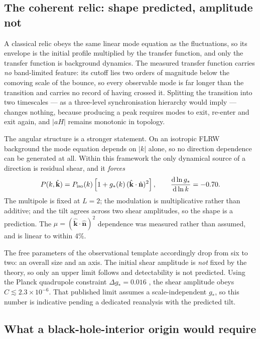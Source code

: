 \documentclass[a4paper,11pt]{article}
\begin{document}
\subsection{The coherent relic: shape predicted, amplitude not}

A classical relic obeys the same linear mode equation as the fluctuations, so its envelope is the initial profile multiplied by the transfer function, and only the transfer function is background dynamics. The measured transfer function carries \emph{no} band-limited feature: its cutoff lies two orders of magnitude below the comoving scale of the bounce, so every observable mode is far longer than the transition and carries no record of having crossed it. Splitting the transition into two timescales --- as a three-level synchronisation hierarchy would imply --- changes nothing, because producing a peak requires modes to exit, re-enter and exit again, and $|aH|$ remains monotonic in topology.

The angular structure is a stronger statement. On an isotropic FLRW background the mode equation depends on $|k|$ alone, so no direction dependence can be generated at all. Within this framework the only dynamical source of a direction is residual shear, and it \emph{forces}
\begin{equation}
P(k,\hat{\mathbf k})=P_{\rm iso}(k)\left[1+g_*(k)\,(\hat{\mathbf k}\cdot\hat{\mathbf n})^{2}\right],
\qquad
\frac{\mathrm{d}\ln g_*}{\mathrm{d}\ln k}=-0.70 .
\end{equation}
The multipole is fixed at $L=2$; the modulation is multiplicative rather than additive; and the tilt agrees across two shear amplitudes, so the shape is a prediction. The $\mu=(\hat{\mathbf k}\cdot\hat{\mathbf n})^{2}$ dependence was measured rather than assumed, and is linear to within $4\%$.

The free parameters of the observational template accordingly drop from six to two: an overall size and an axis. The initial shear amplitude is \emph{not} fixed by the theory, so only an upper limit follows and detectability is not predicted. Using the Planck quadrupole constraint $\Delta g_*=0.016$ \cite{KimKomatsu}, the shear amplitude obeys $C\lesssim2.3\times10^{-6}$. That published limit assumes a scale-independent $g_*$, so this number is indicative pending a dedicated reanalysis with the predicted tilt.

\subsection{What a black-hole-interior origin would require}
\end{document}
